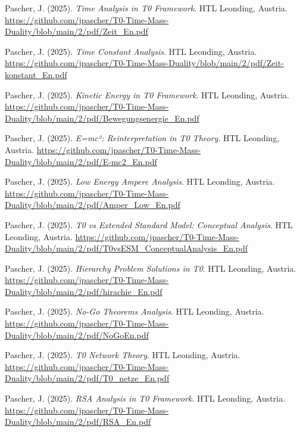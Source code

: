 \documentclass{article}
\begin{document}
\begin{thebibliography}{99}
		Pascher, J. (2025).
		\textit{Time Analysis in T0 Framework}.
		HTL Leonding, Austria.
		\url{https://github.com/jpascher/T0-Time-Mass-Duality/blob/main/2/pdf/Zeit_En.pdf}
		
		Pascher, J. (2025).
		\textit{Time Constant Analysis}.
		HTL Leonding, Austria.
		\url{https://github.com/jpascher/T0-Time-Mass-Duality/blob/main/2/pdf/Zeit-konstant_En.pdf}
		
		Pascher, J. (2025).
		\textit{Kinetic Energy in T0 Framework}.
		HTL Leonding, Austria.
		\url{https://github.com/jpascher/T0-Time-Mass-Duality/blob/main/2/pdf/Bewegungsenergie_En.pdf}
		
		Pascher, J. (2025).
		\textit{E=mc²: Reinterpretation in T0 Theory}.
		HTL Leonding, Austria.
		\url{https://github.com/jpascher/T0-Time-Mass-Duality/blob/main/2/pdf/E-mc2_En.pdf}
		
		Pascher, J. (2025).
		\textit{Low Energy Ampere Analysis}.
		HTL Leonding, Austria.
		\url{https://github.com/jpascher/T0-Time-Mass-Duality/blob/main/2/pdf/Amper_Low_En.pdf}
		
		
		Pascher, J. (2025).
		\textit{T0 vs Extended Standard Model: Conceptual Analysis}.
		HTL Leonding, Austria.
		\url{https://github.com/jpascher/T0-Time-Mass-Duality/blob/main/2/pdf/T0vsESM_ConceptualAnalysis_En.pdf}
		
		Pascher, J. (2025).
		\textit{Hierarchy Problem Solutions in T0}.
		HTL Leonding, Austria.
		\url{https://github.com/jpascher/T0-Time-Mass-Duality/blob/main/2/pdf/hirachie_En.pdf}
		
		Pascher, J. (2025).
		\textit{No-Go Theorems Analysis}.
		HTL Leonding, Austria.
		\url{https://github.com/jpascher/T0-Time-Mass-Duality/blob/main/2/pdf/NoGoEn.pdf}
		
		Pascher, J. (2025).
		\textit{T0 Network Theory}.
		HTL Leonding, Austria.
		\url{https://github.com/jpascher/T0-Time-Mass-Duality/blob/main/2/pdf/T0_netze_En.pdf}
		
		
		Pascher, J. (2025).
		\textit{RSA Analysis in T0 Framework}.
		HTL Leonding, Austria.
		\url{https://github.com/jpascher/T0-Time-Mass-Duality/blob/main/2/pdf/RSA_En.pdf}
		

\end{thebibliography}
\end{document}
